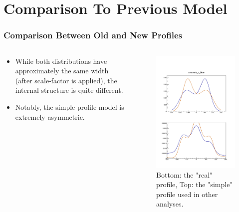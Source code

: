 \section{Comparison To Previous Model}
\label{ch:AmareshComparison}

\begin{frame}
\frametitle{Comparison Between Old and New Profiles}

\begin{columns}[onlytextwidth]
  \begin{column}{0.5\textwidth}
    \begin{itemize}
			\item While both distributions have approximately the same width (after
      scale-factor is applied), the internal structure is quite different.
      \item Notably, the simple profile model is extremely asymmetric.
    \end{itemize}
  \end{column}

  \begin{column}{0.5\textwidth}
    \centering
    \begin{figure}
    \begin{center}
    \includegraphics[width=0.8\linewidth]{../AmareshComparison/figs/z_prof_comparison.pdf}
    \end{center}
    \caption{Bottom: the "real" profile, Top: the "simple" profile used in other analyses.}
    \label{fig:359711_step_0_zvertex_compare_tuned}
    \end{figure}
  \end{column}

\end{columns}
\end{frame}

